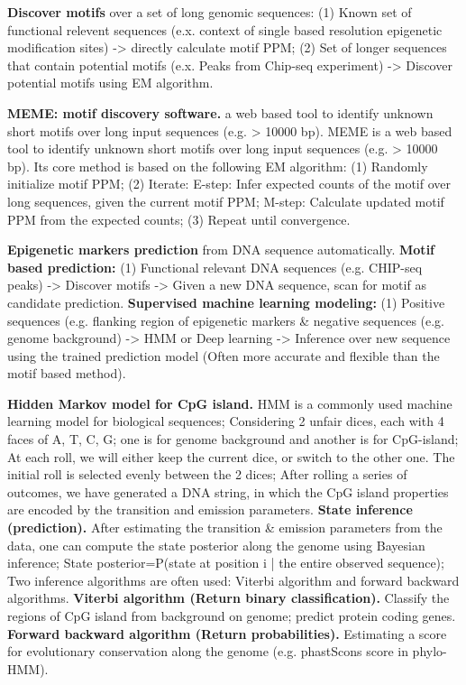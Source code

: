 \vspace{0.1em}\noindent
\textbf{Discover motifs} over a set of long genomic sequences: (1) Known set of functional relevent sequences (e.x. context of single based resolution epigenetic modification sites) -> directly calculate motif PPM; (2) Set of longer sequences that contain potential motifs (e.x. Peaks from Chip-seq experiment) -> Discover potential motifs using EM algorithm.

\vspace{0.1em}\noindent
\textbf{MEME: motif discovery software.} a web based tool to identify unknown short motifs over long input sequences (e.g. > 10000 bp). MEME is a web based tool to identify unknown short motifs over long input sequences (e.g. > 10000 bp). Its core method is based on the following EM algorithm: (1) Randomly initialize motif PPM; (2) Iterate: E-step: Infer expected counts of the motif over long sequences, given the current motif PPM; M-step: Calculate updated motif PPM from the expected counts; (3) Repeat until convergence.

\vspace{0.1em}\noindent
\textbf{Epigenetic markers prediction} from DNA sequence automatically. \textbf{Motif based prediction:} (1) Functional relevant DNA sequences (e.g. CHIP-seq peaks) -> Discover motifs -> Given a new DNA sequence, scan for motif as candidate prediction. \textbf{Supervised machine learning modeling: } (1) Positive sequences (e.g. flanking region of epigenetic markers \& negative sequences (e.g. genome background) -> HMM or Deep learning -> Inference over new sequence using the trained prediction model (Often more accurate and flexible than the motif based method).

\vspace{0.1em}\noindent
\textbf{Hidden Markov model for CpG island.} HMM is a commonly used machine learning model for biological sequences; Considering 2 unfair dices, each with 4 faces of {A, T, C, G}; one is for genome background and another is for CpG-island; At each roll, we will either keep the current dice, or switch to the other one. The initial roll is selected evenly between the 2 dices; After rolling a series of outcomes, we have generated a DNA string, in which the CpG island properties are encoded by the transition and emission parameters. \textbf{State inference (prediction).} After estimating the transition \& emission parameters from the data, one can compute the state posterior along the genome using Bayesian inference; State posterior=P(state at position i | the entire observed sequence); Two inference algorithms are often used: Viterbi algorithm and forward backward algorithms. \textbf{Viterbi algorithm (Return binary classification).} Classify the regions of CpG island from background on genome; predict protein coding genes. \textbf{Forward backward algorithm (Return probabilities).} Estimating a score for evolutionary conservation along the genome (e.g. phastScons score in phylo-HMM).


